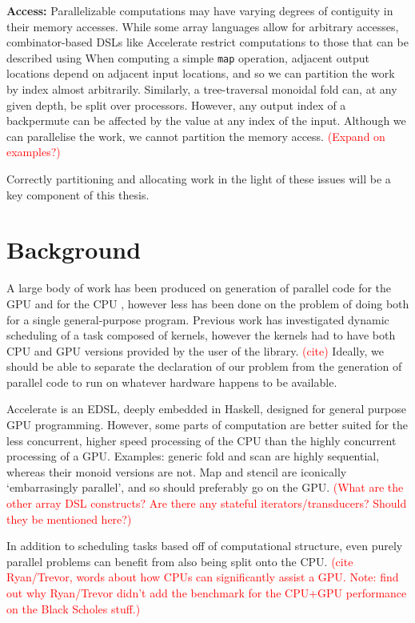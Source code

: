 \documentclass[a4paper,12pt]{article}
\newcommand{\red}[1]{\textcolor{red}{#1}}
\begin{document}
\begin{multicols}{2}
\textbf{Access:} Parallelizable computations may have varying degrees of contiguity in their memory accesses. While some array languages allow for arbitrary accesses, combinator-based DSLs like Accelerate restrict computations to those that can be described using When computing a simple \texttt{map} operation, adjacent output locations depend on adjacent input locations, and so we can partition the work by index almost arbitrarily. Similarly, a tree-traversal monoidal fold can, at any given depth, be split over processors. However, any output index of a backpermute can be affected by the value at any index of the input. Although we can parallelise the work, we cannot partition the memory access. \red{(Expand on examples?)}

Correctly partitioning and allocating work in the light of these issues will be a key component of this thesis.


\section{Background}

A large body of work has been produced on generation of parallel code for the GPU and for the CPU \citep{lee_transparent_2013}, however less has been done on the problem of doing both for a single general-purpose program. Previous work has investigated dynamic scheduling of a task composed of kernels, however the kernels had to have both CPU and GPU versions provided by the user of the library. \red{(cite)} Ideally, we should be able to separate the declaration of our problem from the generation of parallel code to run on whatever hardware happens to be available.

Accelerate is an EDSL, deeply embedded in Haskell, designed for general purpose GPU programming. However, some parts of computation are better suited for the less concurrent, higher speed processing of the CPU than the highly concurrent processing of a GPU. Examples: generic fold and scan are highly sequential, whereas their monoid versions are not. Map and stencil are iconically `embarrasingly parallel', and so should preferably go on the GPU. \red{(What are the other array DSL constructs? Are there any stateful iterators/transducers? Should they be mentioned here?)}

In addition to scheduling tasks based off of computational structure, even purely parallel problems can benefit from also being split onto the CPU. \red{(cite Ryan/Trevor, words about how CPUs can significantly assist a GPU. Note: find out why Ryan/Trevor didn't add the benchmark for the CPU+GPU performance on the Black Scholes stuff.)}


\end{multicols}
\end{document}
